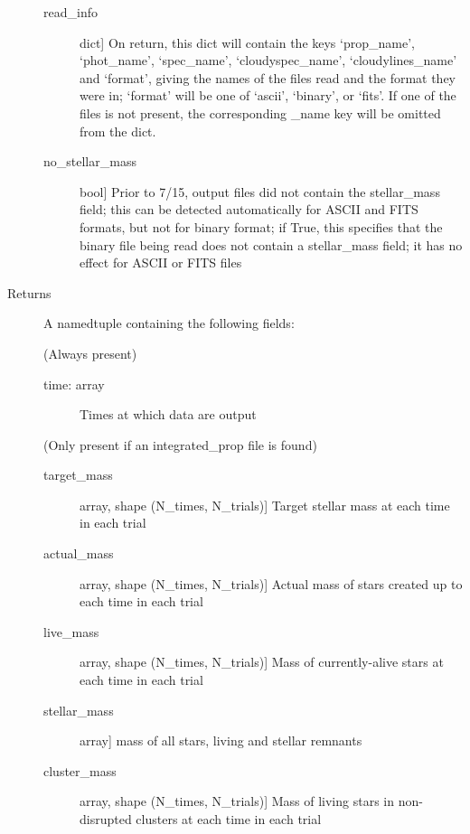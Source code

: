 \documentclass[letterpaper,10pt,english]{sphinxmanual}
\begin{document}
\begin{fulllineitems}
\begin{description}
\begin{description}
\item[{read\_info}] \leavevmode{[}dict{]}
On return, this dict will contain the keys ‘prop\_name’,
‘phot\_name’, ‘spec\_name’, ‘cloudyspec\_name’, ‘cloudylines\_name’
and ‘format’, giving the names of the files read and the format
they were in; ‘format’ will be one of ‘ascii’, ‘binary’, or
‘fits’. If one of the files is not present, the corresponding
\_name key will be omitted from the dict.

\item[{no\_stellar\_mass}] \leavevmode{[}bool{]}
Prior to 7/15, output files did not contain the stellar\_mass
field; this can be detected automatically for ASCII and FITS
formats, but not for binary format; if True, this specifies
that the binary file being read does not contain a
stellar\_mass field; it has no effect for ASCII or FITS files

\end{description}

\item[{Returns}] \leavevmode
A namedtuple containing the following fields:

(Always present)
\begin{description}
\item[{time: array}] \leavevmode
Times at which data are output

\end{description}

(Only present if an integrated\_prop file is found)
\begin{description}
\item[{target\_mass}] \leavevmode{[}array, shape (N\_times, N\_trials){]}
Target stellar mass at each time in each trial

\item[{actual\_mass}] \leavevmode{[}array, shape (N\_times, N\_trials){]}
Actual mass of stars created up to each time in each trial

\item[{live\_mass}] \leavevmode{[}array, shape (N\_times, N\_trials){]}
Mass of currently-alive stars at each time in each trial

\item[{stellar\_mass}] \leavevmode{[}array{]}
mass of all stars, living and stellar remnants

\item[{cluster\_mass}] \leavevmode{[}array, shape (N\_times, N\_trials){]}
Mass of living stars in non-disrupted clusters at each time in
each trial


\end{description}
\end{description}
\end{fulllineitems}
\end{document}
